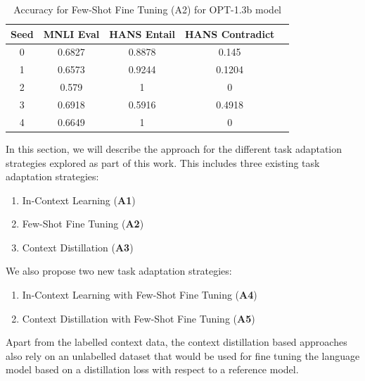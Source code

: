 \documentclass[10pt,twocolumn,letterpaper]{article}
\begin{document}
\begin{table}[h!]
\begin{center}
\begin{tabular}{|c|c|c|c|c|}
\hline
\textbf{Seed} & \textbf{MNLI Eval} & \textbf{HANS Entail} & \textbf{HANS Contradict} \\
\hline
\hline
0 & 0.6827 & 0.8878 & 0.145 \\
1 & 0.6573 & 0.9244 & 0.1204 \\
2 & 0.579 & 1 & 0 \\
3 & 0.6918 & 0.5916 & 0.4918 \\
4 & 0.6649 & 1 & 0 \\
\hline
\end{tabular}
\end{center}
\caption{Accuracy for Few-Shot Fine Tuning (A2) for OPT-1.3b model}
\end{table}


In this section, we will describe the approach for the different task adaptation strategies explored as part of this work. This includes three existing task adaptation strategies:
\begin{enumerate}
    \item In-Context Learning (\textbf{A1})
	\item Few-Shot Fine Tuning (\textbf{A2})
	\item Context Distillation (\textbf{A3})
\end{enumerate}
We also propose two new task adaptation strategies:
\begin{enumerate}
	\item In-Context Learning with Few-Shot Fine Tuning (\textbf{A4})
	\item Context Distillation with Few-Shot Fine Tuning (\textbf{A5})
\end{enumerate}
Apart from the labelled context data, the context distillation based approaches also rely on an unlabelled dataset that would be used for fine tuning the language model based on a distillation loss with respect to a reference model. 
\end{document}
